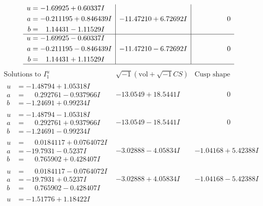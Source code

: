 \documentclass[1p]{elsarticle_modified}
\theoremstyle{definition}
\newcommand{\I}{\sqrt{-1}}
\begin{document}
$$\begin{array}{c|c|c}
\begin{aligned}
u &= -1.69925 + 0.60337 I \\
a &= -0.211195 + 0.846439 I \\
b &= \phantom{-}1.14431 - 1.11529 I\end{aligned}
 & -11.47210 + 6.72692 I & \phantom{-0.000000 } 0 \\ \hline\begin{aligned}
u &= -1.69925 - 0.60337 I \\
a &= -0.211195 - 0.846439 I \\
b &= \phantom{-}1.14431 + 1.11529 I\end{aligned}
 & -11.47210 - 6.72692 I & \phantom{-0.000000 } 0\\
 \hline 
 \end{array}$$\newpage$$\begin{array}{c|c|c}  
\text{Solutions to }I^u_{1}& \I (\text{vol} + \sqrt{-1}CS) & \text{Cusp shape}\\
 \hline 
\begin{aligned}
u &= -1.48794 + 1.05318 I \\
a &= \phantom{-}0.292761 - 0.937966 I \\
b &= -1.24691 + 0.99234 I\end{aligned}
 & -13.0549 + 18.5441 I & \phantom{-0.000000 } 0 \\ \hline\begin{aligned}
u &= -1.48794 - 1.05318 I \\
a &= \phantom{-}0.292761 + 0.937966 I \\
b &= -1.24691 - 0.99234 I\end{aligned}
 & -13.0549 - 18.5441 I & \phantom{-0.000000 } 0 \\ \hline\begin{aligned}
u &= \phantom{-}0.0184117 + 0.0764072 I \\
a &= -19.7931 - 0.5237 I \\
b &= \phantom{-}0.765902 + 0.428407 I\end{aligned}
 & -3.02888 - 4.05834 I & -1.04168 + 5.42388 I \\ \hline\begin{aligned}
u &= \phantom{-}0.0184117 - 0.0764072 I \\
a &= -19.7931 + 0.5237 I \\
b &= \phantom{-}0.765902 - 0.428407 I\end{aligned}
 & -3.02888 + 4.05834 I & -1.04168 - 5.42388 I \\ \hline\begin{aligned}
u &= -1.51776 + 1.18422 I \\

\end{aligned}
\end{array}$$
\end{document}
